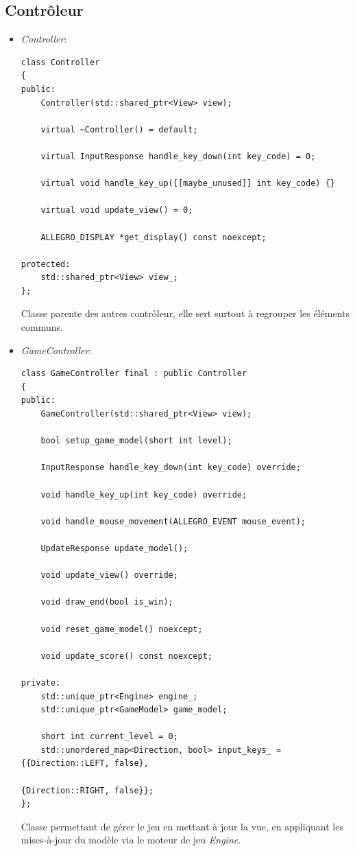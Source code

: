 \documentclass[utf8]{article}
\begin{document}
\subsection{Contrôleur}
\begin{itemize}
    \item \emph{Controller}:
    \begin{verbatim}
class Controller
{
public:
    Controller(std::shared_ptr<View> view);

    virtual ~Controller() = default;

    virtual InputResponse handle_key_down(int key_code) = 0;
    
    virtual void handle_key_up([[maybe_unused]] int key_code) {}
    
    virtual void update_view() = 0;

    ALLEGRO_DISPLAY *get_display() const noexcept;

protected:
    std::shared_ptr<View> view_;
};
    \end{verbatim}
    Classe parente des autres contrôleur, elle sert surtout à regrouper les éléments communs. \\
    
    \item \emph{GameController}:
    \begin{verbatim}
class GameController final : public Controller
{
public:
    GameController(std::shared_ptr<View> view);

    bool setup_game_model(short int level);

    InputResponse handle_key_down(int key_code) override;

    void handle_key_up(int key_code) override;

    void handle_mouse_movement(ALLEGRO_EVENT mouse_event);

    UpdateResponse update_model();

    void update_view() override;

    void draw_end(bool is_win);

    void reset_game_model() noexcept;

    void update_score() const noexcept;

private:
    std::unique_ptr<Engine> engine_;
    std::unique_ptr<GameModel> game_model;

    short int current_level = 0;
    std::unordered_map<Direction, bool> input_keys_ = {{Direction::LEFT, false},
                                                       {Direction::RIGHT, false}};
};
    \end{verbatim}
    Classe permettant de gérer le jeu en mettant à jour la vue, en appliquant les mises-à-jour du modèle via le moteur de jeu \emph{Engine}. \\


\end{itemize}
\end{document}
